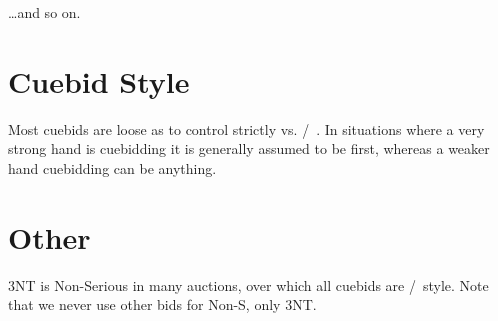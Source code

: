 \documentclass[main]{subfile}
\begin{document}
\ldots and so on.

\section{Cuebid Style}

Most cuebids are loose as to \first control strictly vs. \first/~\second.  In situations where a very strong hand is cuebidding it is generally assumed to be first, whereas a weaker hand cuebidding can be anything.

\section{Other}

3NT is Non-Serious in many auctions, over which all cuebids are \first/~\second style.  Note that we never use other bids for Non-S, only 3NT.
\end{document}
